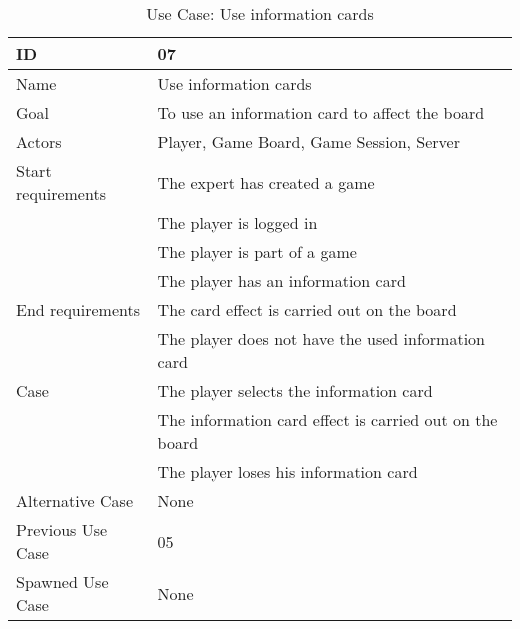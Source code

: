 \begin{table}[H]
\begin{tabular}{|l|l|}
\hline
	\textbf{ID} & \textbf{07}\\ \hline
	Name & Use information cards\\ \hline
	Goal & To use an information card to affect the board\\ \hline
	Actors & Player, Game Board, Game Session, Server\\ \hline
	Start requirements & The expert has created a game\\
				& The player is logged in\\
				& The player is part of a game\\
				& The player has an information card \\ \hline
	End requirements & The card effect is carried out on the board\\
				& The player does not have the used information card \\ \hline
	Case & The player selects the information card\\
		& The information card effect is carried out on the board\\
		& The player loses his information card \\ \hline
	Alternative Case & None \\ \hline
	Previous Use Case & 05\\ \hline
	Spawned Use Case & None\\ \hline
\end{tabular}
\caption{Use Case: Use information cards}
\label{fig:usecase07table}
\end{table}


